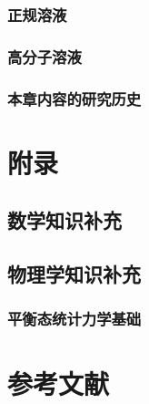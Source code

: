 \documentclass[
  zihao=5,
  linespread=1.3,
  a4paper,
  heading=true,
  twoside
]{ctexbook}
\theoremstyle{definition}
\theoremstyle{plain}
\begin{document}
\section{正规溶液}

\section{高分子溶液}

% 
\section{本章内容的研究历史}


\part*{附录}
\appendix
\chapter{数学知识补充}

\chapter{物理学知识补充}
\section{平衡态统计力学基础}


\newpage
\part*{参考文献}
\printbibliography[heading=none]
\end{document}
